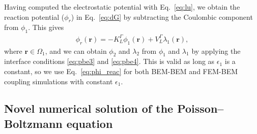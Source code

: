 %
%

Having computed the electrostatic potential with Eq.~\eqref{eq:lu}, we obtain the reaction potential ($\phi_r$) in Eq.~\eqref{eq:dG} by subtracting the Coulombic component from $\phi_1$. This gives\cite{CooperBardhanBarba2014}
%
\begin{align} \label{eq:phi_reac}
\phi_{r}(\mathbf{r}) = - K_{L}^{\Gamma} \phi_1(\mathbf{r}) + V_{L}^{\Gamma}  \lambda_1(\mathbf{r}),
\end{align}
%
where $\mathbf{r}\in\Omega_1$, and we can obtain $\phi_2$ and $\lambda_2$ from $\phi_1$ and $\lambda_1$ by applying the interface conditions \eqref{eq:pbe3} and \eqref{eq:pbe4}.
This is valid as long as $\epsilon_1$ is a constant, so we use Eq.~\eqref{eq:phi_reac} for both BEM-BEM and FEM-BEM coupling simulations with constant $\epsilon_1$.



\subsection*{\sffamily \large Novel numerical solution of the Poisson--Boltzmann equation}


